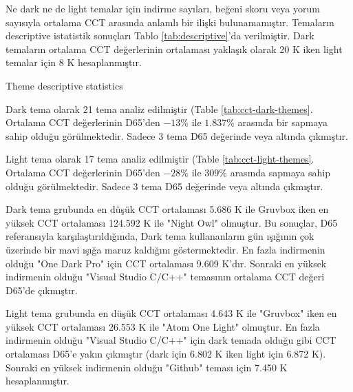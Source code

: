 \documentclass{article}
\begin{document}
Ne dark ne de light temalar için indirme sayıları, beğeni skoru veya yorum sayısıyla ortalama CCT arasında anlamlı bir
ilişki bulunamamıştır. Temaların descriptive istatistik sonuçları Tablo \ref{tab:descriptive}'da verilmiştir. Dark
temaların ortalama CCT değerlerinin ortalaması yaklaşık olarak 20 K iken light temalar için 8 K hesaplanmıştır. 

  
\begin{table}[H]

	\caption{Theme descriptive statistics}
	\label{tab:descriptive}
\end{table}

Dark tema olarak 21 tema analiz edilmiştir (Table \ref{tab:cct-dark-themes}. Ortalama CCT değerlerinin D65'den $-13\%$
ile $1.837\%$ arasında bir sapmaya sahip olduğu görülmektedir. Sadece 3 tema D65 değerinde veya altında çıkmıştır.

Light tema olarak 17 tema analiz edilmiştir (Table \ref{tab:cct-light-themes}. Ortalama CCT değerlerinin D65'den $-28\%$
ile $309\%$ arasında sapmaya sahip olduğu görülmektedir. Sadece 3 tema D65 değerinde veya altında çıkmıştır.

Dark tema grubunda en düşük CCT ortalaması 5.686 K ile Gruvbox iken en yüksek CCT ortalaması 124.592 K ile "Night Owl"
olmuştur. Bu sonuçlar, D65 referansıyla karşılaştırıldığında, Dark tema kullananların gün ışığının çok üzerinde bir mavi
ışığa maruz kaldığını göstermektedir. En fazla indirmenin olduğu "One Dark Pro" için CCT ortalaması 9.609 K'dır. Sonraki
en yüksek indirmenin olduğu "Visual Studio C/C++" temasının ortalama CCT değeri D65'de çıkmıştır.

Light tema grubunda en düşük CCT ortalaması 4.643 K ile "Gruvbox" iken en yüksek CCT ortalaması 26.553 K ile "Atom One
Light" olmuştur. En fazla indirmenin olduğu "Visual Studio C/C++" için dark temada olduğu gibi CCT ortalaması D65'e yakın
çıkmıştır (dark için 6.802 K iken light için 6.872 K). Sonraki en yüksek indirmenin olduğu "Github" teması için 7.450 K
hesaplanmıştır.
\end{document}
